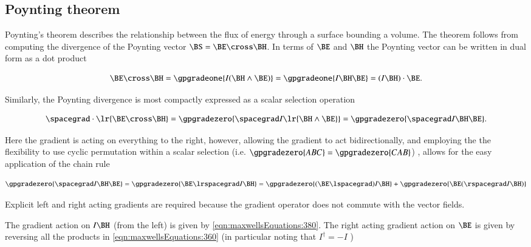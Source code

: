 %
%
\subsection{Poynting theorem}

Poynting's theorem describes the relationship between the flux of energy through a surface bounding a volume.
The theorem follows from computing the divergence of the Poynting vector \( \BS = \BE \cross \BH \).  In terms of \( \BE \) and \( \BH \) the Poynting vector can be written in dual form as a dot product

\begin{equation}\label{eqn:maxwellsEquations:780}
\BE \cross \BH
=
\gpgradeone{ I (\BH \wedge \BE) }
=
\gpgradeone{ I \BH \BE }
=
(I \BH) \cdot \BE.
\end{equation}

Similarly, the Poynting divergence is most compactly expressed as a scalar selection operation

\begin{equation}\label{eqn:maxwellsEquations:640}
\spacegrad \cdot \lr{ \BE \cross \BH }
=
\gpgradezero{ \spacegrad I \lr{ \BH \wedge \BE } }
=
\gpgradezero{ \spacegrad I \BH \BE }.
\end{equation}

Here the gradient is acting on everything to the right, however, allowing the gradient to act bidirectionally, and employing the
the flexibility to use cyclic permutation within a scalar selection
(i.e. \(\gpgradezero{ABC} = \gpgradezero{CAB}\))
, allows for the easy application of the chain rule

\begin{dmath}\label{eqn:maxwellsEquations:760}
\gpgradezero{ \spacegrad I \BH \BE }
=
\gpgradezero{ \BE \lrspacegrad I \BH }
=
\gpgradezero{ (\BE \lspacegrad) I \BH }
+\gpgradezero{ \BE (\rspacegrad I \BH) }
\end{dmath}

Explicit left and right acting gradients are required because the gradient operator does not commute with the vector fields.

The gradient action on \( I \BH \) (from the left) is given by
\cref{eqn:maxwellsEquations:380}.  The right acting gradient action on \( \BE \) is given by reversing all the products in
\cref{eqn:maxwellsEquations:360} (in particular noting that \( I^\dagger = -I \) )

